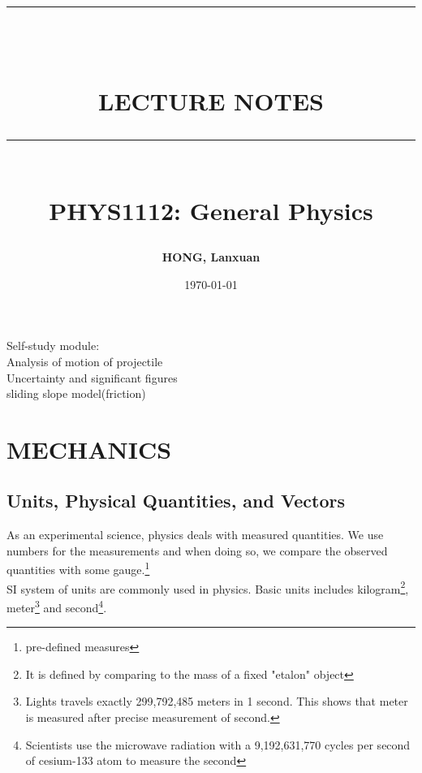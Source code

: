\documentclass[10pt, a4paper]{article}
\newcommand{\HRule}[1]{\rule{\linewidth}{#1}}
\begin{document}
\title{ \normalsize \textsc{}
\\ [2.0cm]
\HRule{1.5pt} \\
\LARGE {\textbf{\uppercase{Lecture Notes}}
\HRule{2.0pt} \\ [0.6cm] \LARGE{\textbf{PHYS1112: General Physics}} \vspace*{10\baselineskip}}
}
\date{\today}
\author{\textbf{HONG, Lanxuan}}
\maketitle
\newpage
Self-study module:\\
Analysis of motion of projectile\\
Uncertainty and significant figures\\
sliding slope model(friction)

\clearpage
\tableofcontents
\newpage
\section{MECHANICS}
\subsection{Units, Physical Quantities, and Vectors}
As an experimental science, physics deals with measured quantities. We use numbers for the measurements and when doing so, we compare the observed quantities with some gauge.\footnote{pre-defined measures}\\

SI system of units are commonly used in physics. Basic units includes kilogram\footnote{It is defined by comparing to the mass of a fixed "etalon" object}, meter\footnote{Lights travels exactly 299,792,485 meters in 1 second. This shows that meter is measured after precise measurement of second.} and second\footnote{Scientists use the microwave radiation with a 9,192,631,770 cycles per second of cesium-133 atom to measure the second}.\\
\end{document}
